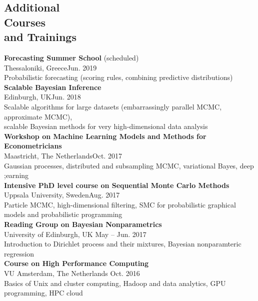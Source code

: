\documentclass[margin,line]{resume}
\begin{document}
\begin{resume}
   \section{\mysidestyle Additional\\ Courses \\and Trainings} 
	\textbf{Forecasting Summer School} (scheduled)\\
        Thessaloniki, Greece\hfill Jun. 2019\\
        Probabilistic forecasting (scoring rules, combining predictive distributions)\vspace{1.5mm} \\	
	\textbf{Scalable Bayesian Inference}\\
        Edinburgh, UK\hfill Jun. 2018\\
        Scalable algorithms for large datasets (embarrassingly parallel MCMC, approximate MCMC),\\ scalable Bayesian methods for very high-dimensional data analysis\vspace{1.5mm} \\	
	\textbf{Workshop on Machine Learning Models and Methods for Econometricians}\\
        Maastricht, The Netherlands\hfill Oct. 2017\\
        Gaussian processes, distributed and subsampling MCMC, variational Bayes,  deep ;earning\vspace{1.5mm} \\	
	\textbf{Intensive PhD level course on Sequential Monte Carlo Methods}\\
        Uppsala University, Sweden\hfill Aug. 2017\\
        Particle MCMC, high-dimensional filtering, SMC for probabilistic graphical models and probabilistic programming\vspace{1.5mm} \\   
	\textbf{Reading Group on Bayesian Nonparametrics}\\
        University of Edinburgh, UK \hfill May -- Jun. 2017\\
        Introduction to Dirichlet process and their mixtures, Bayesian nonparamteric regression\vspace{1.5mm} \\
	\textbf{Course on High Performance Computing}\\
        VU Amsterdam, The Netherlands \hfill Oct. 2016\\
        Basics of Unix and cluster computing,  Hadoop and data analytics, GPU programming, HPC cloud\vspace{1.5mm} \\

\end{resume}
\end{document}
